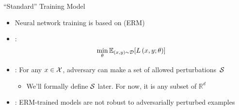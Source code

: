 \begin{frame}{``Standard'' Training Model}
  \begin{itemize}[<+->]
    \setlength{\itemsep}{20pt}
    \item Neural network training is based on \textbf{} (ERM)
    \item \textbf{}:
      \begin{equation}\label{eq:ERM}
        \min_{\theta} \mathbb{E}_{(x,y) \sim \mathcal{D}} \lbrack L \left( x, y ; \theta \right)\rbrack
      \end{equation}

    \item \textbf{}: For any ${x \in \mathcal{X}}$, adversary can make a set of allowed perturbations~$\mathcal{S}$
      \begin{itemize}
        \item We'll formally define $\mathcal{S}$ later.  For now, it is any subset of $\mathbb{R}^{d}$
      \end{itemize}

    \item \textbf{}: ERM-trained models are not robust to adversarially perturbed examples~\cite{Biggio:2013,Szegedy:2013}
  \end{itemize}
\end{frame}


